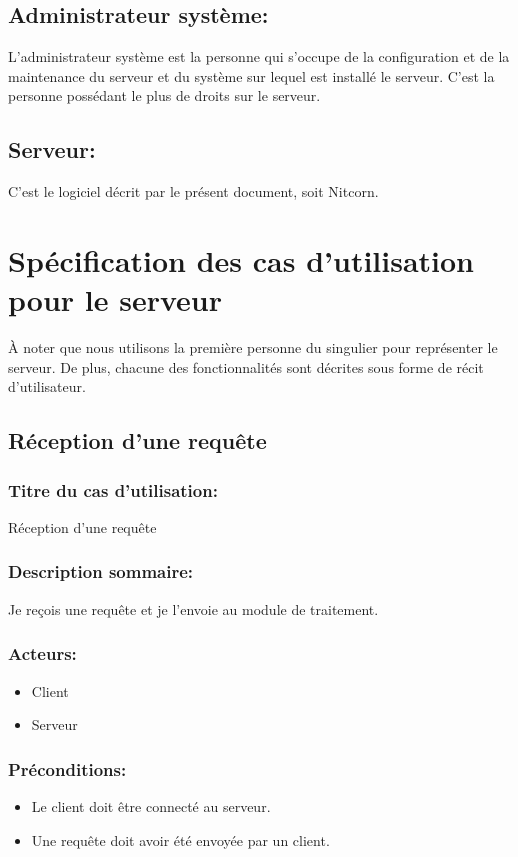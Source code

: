 \documentclass{scrreprt}
\begin{document}
\subsection{Administrateur système:} L'administrateur système est la personne qui s'occupe de la configuration et de la maintenance du serveur et du système sur lequel est installé le serveur. C'est la personne possédant le plus de droits sur le serveur.
\subsection{Serveur:} C'est le logiciel décrit par le présent document, soit Nitcorn.

\section{Spécification des cas d'utilisation pour le serveur} 
À noter que nous utilisons la première personne du singulier pour représenter le serveur. De plus, chacune des fonctionnalités sont décrites sous forme de récit d'utilisateur.
\subsection{Réception d'une requête}
\subsubsection{Titre du cas d'utilisation:} Réception d'une requête
\subsubsection{Description sommaire:} Je reçois une requête et je l'envoie au module de traitement.
\subsubsection{Acteurs:}
\begin{itemize}
    \item Client
    \item Serveur
\end{itemize}
\subsubsection{Préconditions:}
\begin{itemize}
	\item Le client doit être connecté au serveur.
    \item Une requête doit avoir été envoyée par un client.
\end{itemize} 
\end{document}
